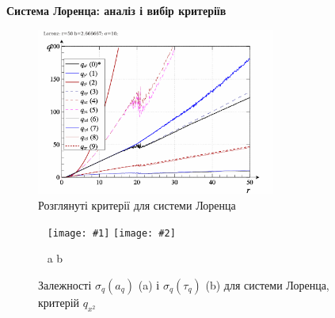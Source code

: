\documentclass[14pt,handout,utf8]{beamer}
\newcommand{\Xhead}[1]{
 \begin{center}%
      \textbf{#1}%
 \end{center}%
}
\newcommand{\ABlbl}{%
  \vspace{-2.9ex}
  \begin{center}
    ~ \hfill a \hfill\hfill b \hfill ~
  \end{center}
  \vspace{-2.0ex}
}
\newcommand{\PicDouble}[2]{%
 \begin{center}
    ~ \hfill
    \texttt{[image: \#1]}
    \hfill
    \texttt{[image: \#2]}
    \hfill ~
  \end{center}
  \ABlbl
}
\begin{document}
\begin{frame}
  \frametitle{~}

  \Xhead{Система Лоренца: аналіз і вибір критеріїв}

  \begin{figure}
    \includegraphics[width=0.7\textwidth]{../p5/p/cha/lor/lor_q-p_q_r.png}
    \caption{Розглянуті критерії для системи Лоренца}
    \label{atu:f:lor_q}
  \end{figure}

  \begin{figure}
    \PicDouble{../p5/p/cha/lor/lor_qx2_tau-p_aq_sd.png}{../p5/p/cha/lor/lor_qx2_tau-p_tau_sd.png}
    \caption{Залежності $\sigma_{q}(a_q)$ (a) і $\sigma_{q}(\tau_q)$ (b) для системи Лоренца, критерій $q_{x^2}$}
    \label{atu:f:lor_qx2_tau}
  \end{figure}

\end{frame}


\end{document}
